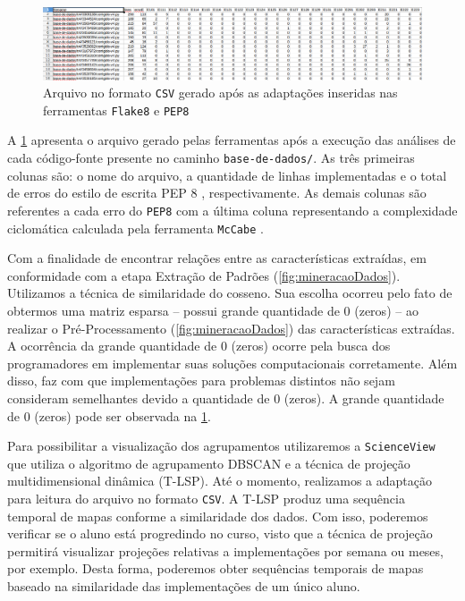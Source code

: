 	\begin{figure}[h]
		\centering
		\includegraphics[width=0.7\linewidth]{imagem/arquivoCSV}
		\caption{Arquivo no formato \texttt{CSV} gerado após as adaptações inseridas nas ferramentas \texttt{Flake8} e \texttt{PEP8}}
		\label{fig:arquivoCSV}
	\end{figure}
	
	A \cref{fig:arquivoCSV} apresenta o arquivo gerado pelas ferramentas após a
	execução das análises de cada código-fonte presente no caminho \texttt{base-de-dados/}.
	As três primeiras colunas são: o nome do arquivo, a quantidade de linhas implementadas
	e o total de erros do estilo de escrita PEP 8 \cite{van2001pep}, respectivamente. As
	demais colunas são referentes a cada erro do \texttt{PEP8} \cite{pep8} com a última
	coluna representando a complexidade ciclomática calculada pela ferramenta
	\texttt{McCabe} \cite{mccabe}.

	Com a finalidade de encontrar relações entre as características extraídas, em
	conformidade com a etapa Extração de Padrões (\cref{fig:mineracaoDados}).
	Utilizamos a técnica de similaridade do cosseno. Sua escolha ocorreu pelo fato de obtermos
	uma matriz esparsa -- possui grande quantidade de 0 (zeros) -- ao realizar o
	Pré-Processamento (\cref{fig:mineracaoDados}) das características extraídas. A
	ocorrência da grande quantidade de 0 (zeros) ocorre pela busca dos programadores
	em implementar suas soluções computacionais corretamente. Além disso, faz com que
	implementações para problemas distintos não sejam consideram semelhantes devido a
	quantidade de 0 (zeros). A grande quantidade de 0 (zeros) pode ser observada na
	\cref{fig:arquivoCSV}.
	
	Para possibilitar a visualização dos agrupamentos utilizaremos a \texttt{ScienceView}
	\cite{Alencar-etal:2012} que utiliza o algoritmo de agrupamento DBSCAN \cite{Ester1996}
	e a técnica de projeção multidimensional dinâmica 
	(T-LSP). Até o momento, realizamos a adaptação para leitura do arquivo no formato
	\texttt{CSV}. A T-LSP produz uma sequência temporal de mapas conforme a similaridade
	dos dados. Com isso, poderemos verificar se o aluno está progredindo no curso, visto
	que a técnica de projeção permitirá visualizar projeções relativas a implementações
	por semana ou meses, por exemplo. Desta forma, poderemos obter sequências temporais
	de mapas baseado na similaridade das implementações de um único aluno.
	
